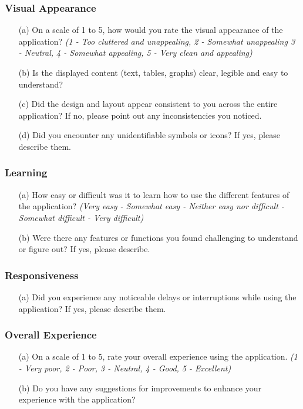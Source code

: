 \documentclass[12pt, titlepage]{article}
\begin{document}
\subsubsection*{\textbf{Visual Appearance}}
  \begin{itemize}
    \item[(a)] On a scale of 1 to 5, how would you rate the visual appearance of
    the application? \textit{(1 - Too cluttered and unappealing, 2 - Somewhat
    unappealing 3 - Neutral, 4 - Somewhat appealing, 5 - Very clean and
    appealing)}
    \item[(b)] Is the displayed content (text, tables, graphs) clear, legible
    and easy to understand?
    \item[(c)] Did the design and layout appear consistent to you across
    the entire application? If no, please point out any inconsistencies you noticed.
    \item[(d)] Did you encounter any unidentifiable symbols or icons? If yes,
    please describe them.
  \end{itemize}

\subsubsection*{\textbf{Learning}}
  \begin{itemize}
    \item[(a)] How easy or difficult was it to learn how to use the different
    features of the application? \textit{(Very easy - Somewhat easy - Neither
    easy nor difficult - Somewhat difficult - Very difficult)}
    \item[(b)] Were there any features or functions you found challenging to
    understand or figure out? If yes, please describe. 
  \end{itemize}

\subsubsection*{\textbf{Responsiveness}}
  \begin{itemize}
    \item[(a)] Did you experience any noticeable delays or interruptions while
    using the application? If yes, please describe them.
  \end{itemize}

\subsubsection*{\textbf{Overall Experience}}
  \begin{itemize}
    \item[(a)] On a scale of 1 to 5, rate your overall experience using the
    application. \textit{(1 - Very poor, 2 - Poor, 3 - Neutral, 4 - Good, 5 -
    Excellent)}
    \item[(b)] Do you have any suggestions for improvements to enhance your
    experience with the application?
  \end{itemize}
\end{document}
